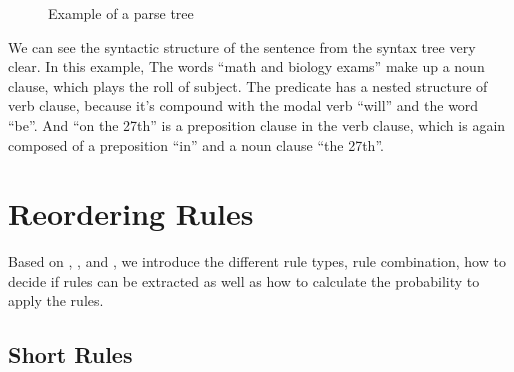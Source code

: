 \begin{figure}
\centering

\caption{Example of a parse tree}
\label{ParseTree}
\end{figure}

We can see the syntactic structure of the sentence from the syntax tree very clear. In this example, The words ``math and biology exams'' make up a noun clause, which plays the roll of subject. The predicate has a nested structure of verb clause, because it's compound with the modal verb ``will'' and the word ``be''. And ``on the 27th'' is a preposition clause in the verb clause, which is again composed of a preposition ``in'' and a noun clause ``the 27th''.


\section{Reordering Rules}
\label{ch:Foundations:sec:types}

Based on \cite{short}, \cite{long}, \cite{tree} and \cite{combine}, we introduce the different rule types, rule combination, how to decide if rules can be extracted as well as how to calculate the probability to apply the rules.

\subsection{Short Rules}

